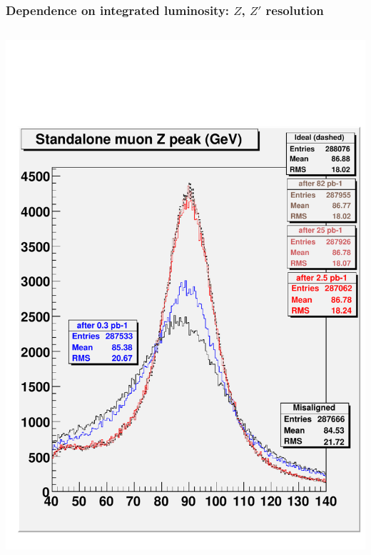 \documentclass[compress]{beamer}
\begin{document}
\begin{frame}
\frametitle{Dependence on integrated luminosity: $Z$, $Z'$ resolution}
\vspace{0.25 cm}
\begin{columns}
\includegraphics[width=\linewidth]{checkit_standaloneZ.pdf}

\end{columns}
\end{frame}
\end{document}
